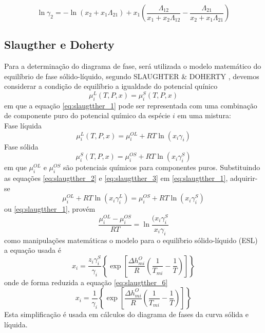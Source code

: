 	\begin{equation}\label{eq:Wilson_4}
	\ln \gamma_{2}=-\ln(x_2+x_1\Lambda_{21} )+x_{1}\left(\frac{\Lambda_{12}}{x_1+x_2\Lambda_{12}}-\frac{\Lambda_{21}}{x_2+x_1\Lambda_{21}}\right)
	\end{equation}
	
	\subsection{Slaugther e Doherty}
	
	\hspace{5mm} Para a determinação do diagrama de fase, será utilizada o modelo matemático do equilíbrio de fase sólido-líquido, segundo SLAUGHTER \& DOHERTY \citeyear{Douglas1995}, devemos considerar a condição de equilíbrio a igualdade do potencial quínico
	\begin{equation}\label{eq:slaugtther_1}
	\mu_{i}^{L}(T,P,x)=\mu_{i}^{S}(T,P,x)
	\end{equation}
	em que a equação \ref{eq:slaugtther_1} pode ser representada com uma combinação de componente puro do potencial químico da espécie $i$ em uma mistura:
	\\ Fase líquida
	\begin{equation}\label{eq:slaugtther_2}
	\mu_{i}^{L}(T,P,x)=\mu_{i}^{OL}+RT\ln(x_i\gamma_{i})
	\end{equation}
	Fase sólida 
	\begin{equation}\label{eq:slaugtther_3}
	\mu_{i}^{S}(T,P,x)=\mu_{i}^{OS}+RT\ln(x_i\gamma_{i}^{S})
	\end{equation}
	em que $\mu_{i}^{OL}$ e $\mu_{i}^{OS}$ são potenciais químicos para componentes puros. 
	Substituindo as equações \ref{eq:slaugtther_2} e \ref{eq:slaugtther_3} em \ref{eq:slaugtther_1}, adquirir-se
	\begin{equation}\label{eq:slaugtther_4}
	\mu_{i}^{OL}+RT\ln(x_i\gamma_{i}^{L})=\mu_{i}^{OS}+RT\ln(x_i\gamma_{i}^{S})
	\end{equation}
	ou
	\ref{eq:slaugtther_1}, provém
	\begin{equation}\label{eq:slaugtther_5}
	\dfrac{\mu_{i}^{OL}-\mu_{i}^{OS}}{RT}=\ln\dfrac{(x_i\gamma_{i}^{S}}{x_i\gamma_{i}}
	\end{equation}
	como manipulações matemáticas o modelo para o equilíbrio sólido-líquido (ESL) a equação usada é
	\begin{equation}\label{eq:slaugtther_6}
	x_i=\dfrac{z_i\gamma_{i}^{S}}{\gamma_{i}}\left\{\exp\left[\dfrac{\Delta h_{mi}^{O}}{R}\left(\dfrac{1}{T_ {mi}}-\dfrac{1}{T}\right)\right]\right\}
	\end{equation}
	onde de forma reduzida a equação \ref{eq:slaugtther_6}
	\begin{equation}\label{eq:slaugtther_7}
	x_i=\dfrac{1}{\gamma_{i}}\left\{\exp\left[\dfrac{\Delta h_{mi}^{O}}{R}\left(\dfrac{1}{T_ {mi}}-\dfrac{1}{T}\right)\right]\right\}
	\end{equation}
	Esta simplificação é usada em cálculos do diagrama de fases da curva sólida e líquida. 
	
